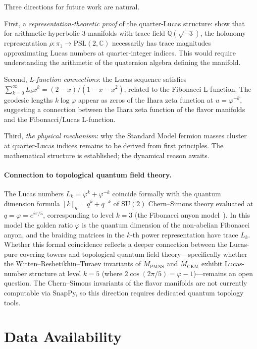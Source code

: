 \documentclass[12pt]{article}
\theoremstyle{definition}
\newcommand{\Q}{\mathbb{Q}}
\newcommand{\C}{\mathbb{C}}
\newcommand{\ph}{\varphi}
\newcommand{\logph}{\log\ph}
\begin{document}
Three directions for future work are natural.

First, a \emph{representation-theoretic proof} of the quarter-Lucas
structure: show that for arithmetic hyperbolic 3-manifolds with
trace field $\Q(\sqrt{-3})$, the holonomy representation
$\rho\colon \pi_1 \to \mathrm{PSL}(2,\C)$ necessarily has trace
magnitudes approximating Lucas numbers at quarter-integer indices.
This would require understanding the arithmetic of the quaternion
algebra defining the manifold.

Second, \emph{L-function connections}: the Lucas sequence satisfies
$\sum_{k=0}^\infty L_k x^k = (2-x)/(1-x-x^2)$, related to the
Fibonacci L-function. The geodesic lengths $k\logph$ appear as zeros
of the Ihara zeta function at $u = \ph^{-k}$, suggesting a connection
between the Ihara zeta function of the flavor manifolds and the
Fibonacci/Lucas L-function.

Third, \emph{the physical mechanism}: why the Standard Model fermion
masses cluster at quarter-Lucas indices remains to be derived from
first principles. The mathematical structure is established; the
dynamical reason awaits.

\paragraph{Connection to topological quantum field theory.}
The Lucas numbers $L_k = \ph^k + \ph^{-k}$ coincide formally
with the quantum dimension formula $[k]_q = q^k + q^{-k}$ of
$\mathrm{SU}(2)$ Chern--Simons theory evaluated at
$q = \ph = e^{i\pi/5}$, corresponding to level $k = 3$
(the Fibonacci anyon model~\cite{preskill-lecture}).
In this model the golden ratio $\ph$ is the quantum dimension
of the non-abelian Fibonacci anyon, and the braiding matrices
in the $k$-th power representation have trace $L_k$.
Whether this formal coincidence reflects a deeper connection
between the Lucas-pure covering towers and topological quantum
field theory---specifically whether the
Witten--Reshetikhin--Turaev invariants of $M_{\mathrm{PMNS}}$
and $M_{\mathrm{CKM}}$ exhibit Lucas-number structure at
level $k = 5$ (where $2\cos(2\pi/5) = \ph - 1$)---remains
an open question. The Chern--Simons invariants of the flavor
manifolds are not currently computable via SnapPy, so this
direction requires dedicated quantum topology tools.

\section*{Data Availability}
\end{document}
